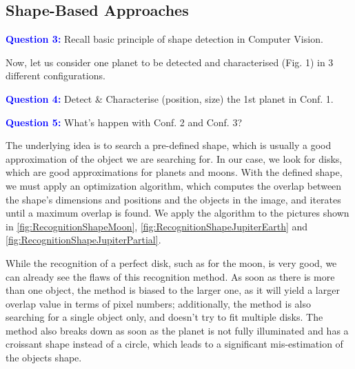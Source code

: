 \subsection{Shape-Based Approaches}

\textbf{\textcolor{blue}{Question 3:}} Recall basic principle of shape detection in Computer Vision.

Now, let us consider one planet to be detected and characterised (Fig. 1) in 3 different configurations.

\textbf{\textcolor{blue}{Question 4:}} Detect \& Characterise (position, size) the 1st planet in Conf. 1.

\textbf{\textcolor{blue}{Question 5:}} What’s happen with Conf. 2 and Conf. 3?

The underlying idea is to search a pre-defined shape, which is usually a good approximation of the object we are searching for. In our case, we look for disks, which are good approximations for planets and moons. With the defined shape, we must apply an optimization algorithm, which computes the overlap between the shape's dimensions and positions and the objects in the image, and iterates until a maximum overlap is found. We apply the algorithm to the pictures shown in \autoref{fig:RecognitionShapeMoon}, \autoref{fig:RecognitionShapeJupiterEarth} and \autoref{fig:RecognitionShapeJupiterPartial}.

While the recognition of a perfect disk, such as for the moon, is very good, we can already see the flaws of this recognition method. As soon as there is more than one object, the method is biased to the larger one, as it will yield a larger overlap value in terms of pixel numbers; additionally, the method is also searching for a single object only, and doesn't try to fit multiple disks. The method also breaks down as soon as the planet is not fully illuminated and has a croissant shape instead of a circle, which leads to a significant mis-estimation of the objects shape.  

